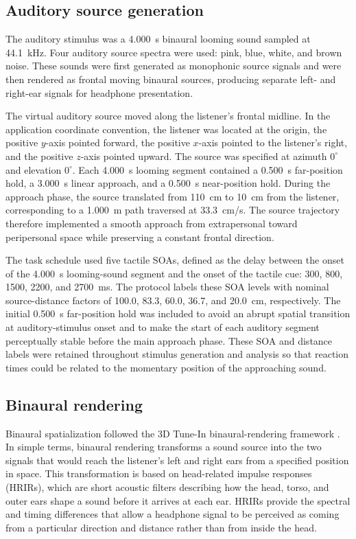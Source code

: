 \subsection{Auditory source generation}

The auditory stimulus was a 4.000~s binaural looming sound sampled at
44.1~kHz. Four auditory source spectra were used: pink, blue, white, and
brown noise. These sounds were first generated as monophonic source signals and
were then rendered as frontal moving binaural sources, producing separate left-
and right-ear signals for headphone presentation.

The virtual auditory source moved along the listener's frontal midline. In the
application coordinate convention, the listener was located at the origin, the
positive \(y\)-axis pointed forward, the positive \(x\)-axis pointed to the
listener's right, and the positive \(z\)-axis pointed upward. The source was
specified at azimuth \(0^\circ\) and elevation \(0^\circ\). Each 4.000~s
looming segment contained a 0.500~s far-position hold, a 3.000~s linear
approach, and a 0.500~s near-position hold. During the approach phase, the
source translated from 110~cm to 10~cm from the listener, corresponding to a
1.000~m path traversed at 33.3~cm/s. The source trajectory therefore
implemented a smooth approach from extrapersonal toward peripersonal space
while preserving a constant frontal direction.

The task schedule used five tactile SOAs, defined as the
delay between the onset of the 4.000~s looming-sound segment and the onset of
the tactile cue: 300, 800, 1500, 2200, and 2700~ms. The protocol labels these
SOA levels with nominal source-distance factors of 100.0, 83.3, 60.0, 36.7,
and 20.0~cm, respectively. The initial 0.500~s far-position hold was included
to avoid an abrupt spatial transition at auditory-stimulus onset and to make
the start of each auditory segment perceptually stable before the main approach
phase. These SOA and distance labels were retained throughout stimulus
generation and analysis so that reaction times could be related to the
momentary position of the approaching sound.

\subsection{Binaural rendering}

Binaural spatialization followed the 3D Tune-In binaural-rendering framework
\citep{CuevasRodriguez2019ThreeDTI}. In simple terms, binaural rendering
transforms a sound source into the two signals that would reach the listener's
left and right ears from a specified position in space. This transformation is
based on head-related impulse responses (HRIRs), which are short acoustic
filters describing how the head, torso, and outer ears shape a sound before it
arrives at each ear. HRIRs provide the spectral and timing differences that
allow a headphone signal to be perceived as coming from a particular direction
and distance rather than from inside the head.

